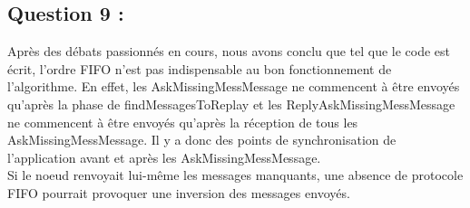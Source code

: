 \documentclass[11pt,a4paper]{report}
\begin{document}
\section{Question 9 :}

Après des débats passionnés en cours, nous avons conclu que tel que le code est écrit, l'ordre FIFO n'est pas indispensable au bon fonctionnement de l'algorithme. En effet, les AskMissingMessMessage ne commencent à être envoyés qu'après la phase de findMessagesToReplay et les ReplyAskMissingMessMessage ne commencent à être envoyés qu'après la réception de tous les AskMissingMessMessage. Il y a donc des points de synchronisation de l'application avant et après les AskMissingMessMessage.\\

Si le noeud renvoyait lui-même les messages manquants, une absence de protocole FIFO pourrait provoquer une inversion des messages envoyés.\\


\chapter{}
\end{document}
